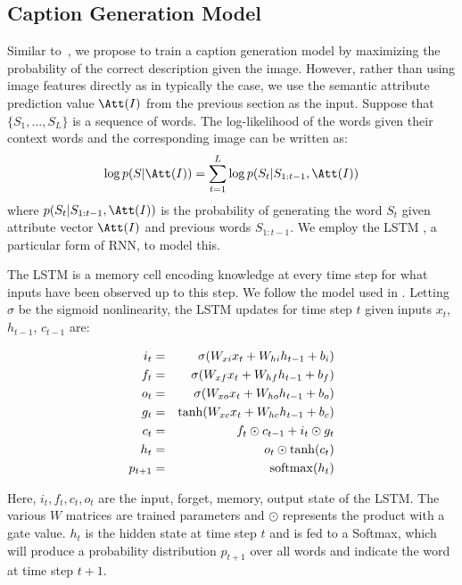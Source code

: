 \subsection{Caption Generation Model}
\label{subsec:caption_model}
Similar to~\cite{Karpathy2014deepvs,mao2014deep,vinyals2014show}, we propose to train a caption generation model by maximizing the probability of the correct description given the image. However, rather than using image features directly as in typically the case, we use the semantic attribute prediction value $\Att(I)$ from the previous section as the input. Suppose that $\{S_1,...,S_L\}$ is a sequence of words. The log-likelihood of the words given their context words and the corresponding image can be written as:
\begin{equation}
    \log p(S|\Att(I))=\sum_{t=1}^L \log p(S_{t}|S_{1:t-1},\Att(I))
\end{equation}
where $p(S_t|S_{1:t-1},\Att(I))$ is the probability of generating the word $S_t$ given attribute vector $\Att(I)$ and previous words $S_{1:t-1}$. We employ the LSTM \cite{hochreiter1997long}, a particular form of RNN, to model this.

The LSTM is a memory cell encoding knowledge at every time step for what inputs have been observed up to this step. We follow the model used in \cite{zaremba2014learning}. Letting $\sigma$ be the sigmoid nonlinearity, the LSTM updates for time step $t$ given inputs $x_t$, $h_{t-1}$, $c_{t-1}$ are:

\vspace{-10pt}
\begin{eqnarray}
  i_t &=& \sigma(W_{xi}x_t+W_{hi}h_{t-1}+b_i) \\
  f_t &=& \sigma(W_{xf}x_t+W_{hf}h_{t-1}+b_f) \\
  o_t &=& \sigma(W_{xo}x_t+W_{ho}h_{t-1}+b_o) \\
  g_t &=& \tanh(W_{xc}x_t+W_{hc}h_{t-1}+b_c) \\
  c_t &=& f_t\odot c_{t-1}+i_t\odot g_t \\
  h_t &=& o_t \odot \tanh(c_t) \\
  p_{t+1} &=& {\rm softmax}(h_t)
\end{eqnarray}

Here, $i_t, f_t, c_t, o_t$ are the input, forget, memory, output state of the LSTM. The various $W$ matrices are trained parameters and $\odot$ represents the product with a gate value. $h_t$ is the hidden state at time step $t$ and is fed to a Softmax, which will produce a probability distribution $p_{t+1}$ over all words and indicate the word at time step $t+1$.

